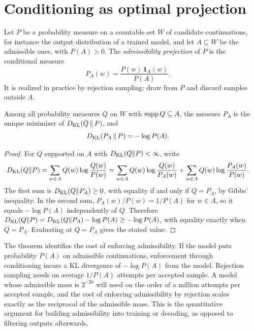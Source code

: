 \section{Conditioning as optimal projection}

Let $P$ be a probability measure on a countable set $W$ of candidate continuations, for instance the output distribution of a trained model, and let $A\subseteq W$ be the admissible ones, with $P(A)>0$. The \emph{admissibility projection} of $P$ is the conditional measure
\[
P_A(w)=\frac{P(w)\,\mathbf{1}_A(w)}{P(A)}.
\]
It is realized in practice by rejection sampling: draw from $P$ and discard samples outside $A$.

\begin{theorem}\label{thm:projection}
Among all probability measures $Q$ on $W$ with $\operatorname{supp} Q\subseteq A$, the measure $P_A$ is the unique minimizer of $D_{\mathrm{KL}}(Q\,\|\,P)$, and
\[
D_{\mathrm{KL}}(P_A\,\|\,P)=-\log P(A).
\]
\end{theorem}

\begin{proof}
For $Q$ supported on $A$ with $D_{\mathrm{KL}}(Q\|P)<\infty$, write
\[
D_{\mathrm{KL}}(Q\|P)=\sum_{w\in A}Q(w)\log\frac{Q(w)}{P(w)}
=\sum_{w\in A}Q(w)\log\frac{Q(w)}{P_A(w)}+\sum_{w\in A}Q(w)\log\frac{P_A(w)}{P(w)}.
\]
The first sum is $D_{\mathrm{KL}}(Q\|P_A)\ge0$, with equality if and only if $Q=P_A$, by Gibbs' inequality. In the second sum, $P_A(w)/P(w)=1/P(A)$ for $w\in A$, so it equals $-\log P(A)$ independently of $Q$. Therefore $D_{\mathrm{KL}}(Q\|P)=D_{\mathrm{KL}}(Q\|P_A)-\log P(A)\ge-\log P(A)$, with equality exactly when $Q=P_A$. Evaluating at $Q=P_A$ gives the stated value.
\end{proof}

The theorem identifies the cost of enforcing admissibility. If the model puts probability $P(A)$ on admissible continuations, enforcement through conditioning incurs a KL divergence of $-\log P(A)$ from the model. Rejection sampling needs on average $1/P(A)$ attempts per accepted sample. A model whose admissible mass is $2^{-20}$ will need on the order of a million attempts per accepted sample, and the cost of enforcing admissibility by rejection scales exactly as the reciprocal of the admissible mass. This is the quantitative argument for building admissibility into training or decoding, as opposed to filtering outputs afterwards.

